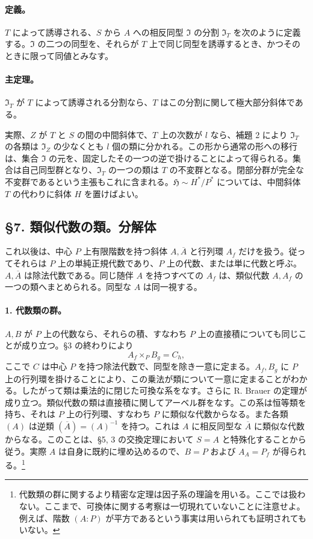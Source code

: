 \paragraph{定義。}
\(T\) によって誘導される、\(S\) から \(A\) への相反同型 \(\mathfrak I\) の分割 \(\mathfrak I_T\) を次のように定義する。\(\mathfrak I\) の二つの同型を、それらが \(T\) 上で同じ同型を誘導するとき、かつそのときに限って同値とみなす。

\paragraph{主定理。}
\(\mathfrak I_T\) が \(T\) によって誘導される分割なら、\(T\) はこの分割に関して極大部分斜体である。

実際、\(Z\) が \(T\) と \(S\) の間の中間斜体で、\(T\) 上の次数が \(l\) なら、補題 2 により \(\mathfrak I_T\) の各類は \(\mathfrak I_Z\) の少なくとも \(l\) 個の類に分かれる。この形から通常の形への移行は、集合 \(\mathfrak I\) の元を、固定したその一つの逆で掛けることによって得られる。集合は自己同型群となり、\(\mathfrak I_T\) の一つの類は \(T\) の不変群となる。閉部分群が完全な不変群であるという主張もこれに含まれる。\(\mathfrak H\sim H^*/P^*\) については、中間斜体 \(T\) の代わりに斜体 \(H\) を置けばよい。

\subsection*{§7. 類似代数の類。分解体}

これ以後は、中心 \(P\) 上有限階数を持つ斜体 \(A,\overline A\) と行列環 \(A_f\) だけを扱う。従ってそれらは \(P\) 上の単純正規代数であり、\(P\) 上の代数、または単に代数と呼ぶ。\(A,\overline A\) は除法代数である。同じ随伴 \(A\) を持つすべての \(A_f\) は、類似代数 \(A,A_f\) の一つの類へまとめられる。同型な \(A\) は同一視する。

\paragraph{1. 代数類の群。}
\(A,B\) が \(P\) 上の代数なら、それらの積、すなわち \(P\) 上の直接積についても同じことが成り立つ。§3 の終わりにより
\[
        A_f\times_P B_g=C_h,
\]
ここで \(C\) は中心 \(P\) を持つ除法代数で、同型を除き一意に定まる。\(A_f,B_g\) に \(P\) 上の行列環を掛けることにより、この乗法が類について一意に定まることがわかる。したがって類は乗法的に閉じた可換な系をなす。さらに R. Brauer の定理が成り立つ。類似代数の類は直接積に関してアーベル群をなす。この系は恒等類を持ち、それは \(P\) 上の行列環、すなわち \(P\) に類似な代数からなる。また各類 \((A)\) は逆類 \((\overline A)=(A)^{-1}\) を持つ。これは \(A\) に相反同型な \(\overline A\) に類似な代数からなる。このことは、§5, 3 の交換定理において \(S=A\) と特殊化することから従う。実際 \(A\) は自身に既約に埋め込めるので、\(B=P\) および \(A_A=P_f\) が得られる。\footnote{代数類の群に関するより精密な定理は因子系の理論を用いる。ここでは扱わない。ここまで、可換体に関する考察は一切現れていないことに注意せよ。例えば、階数 \((A:P)\) が平方であるという事実は用いられても証明されてもいない。}

